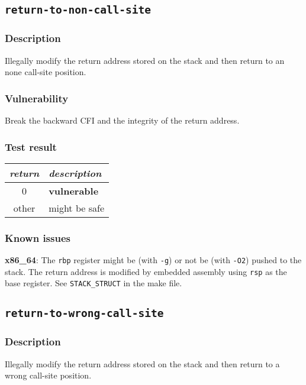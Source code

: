 \documentclass[a4paper]{book}
\begin{document}
\newpage
\subsection{\texttt{return-to-non-call-site}}\label{test-return-to-non-call-site}

\subsubsection{Description}
Illegally modify the return address stored on the stack and then return to an none call-site position.

\subsubsection{Vulnerability}
Break the backward CFI and the integrity of the return address.

\subsubsection{Test result}
\begin{tabular}{cl}
  \toprule
  \emph{return}  & \emph{description} \\
  \midrule
  0              & \textbf{vulnerable} \\
  other          & might be safe \\
  \bottomrule
\end{tabular}
  
\subsubsection{Known issues}

\textbf{x86\_64}: The \texttt{rbp} register might be (with \texttt{-g}) or not be (with \texttt{-O2}) pushed to the stack.
The return address is modified by embedded assembly using \texttt{rsp} as the base register. See \texttt{STACK\_STRUCT} in the make file.

\newpage
\subsection{\texttt{return-to-wrong-call-site}}\label{test-return-to-wrong-call-site}

\subsubsection{Description}
Illegally modify the return address stored on the stack and then return to a wrong call-site position.
\end{document}
